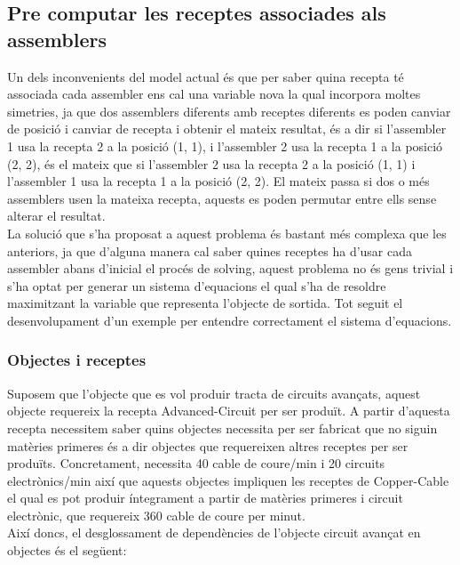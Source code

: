 \subsection{Pre computar les receptes associades als assemblers}\label{precompute-recipes}
Un dels inconvenients del model actual és que per saber quina recepta té associada cada assembler ens cal una variable nova la qual incorpora moltes simetries, ja que dos assemblers diferents amb receptes diferents es poden canviar de posició i canviar de recepta i obtenir el mateix resultat, és a dir si l'assembler 1 usa la recepta 2 a la posició (1, 1), i l'assembler 2 usa la recepta 1 a la posició (2, 2), és el mateix que si l'assembler 2 usa la recepta 2 a la posició (1, 1) i l'assembler 1 usa la recepta 1 a la posició (2, 2). El mateix passa si dos o més assemblers usen la mateixa recepta, aquests es poden permutar entre ells sense alterar el resultat.\\

La solució que s'ha proposat a aquest problema és bastant més complexa que les anteriors, ja que d'alguna manera cal saber quines receptes ha d'usar cada assembler abans d'inicial el procés de solving, aquest problema no és gens trivial i s'ha optat per generar un sistema d'equacions el qual s'ha de resoldre maximitzant la variable que representa l'objecte de sortida. Tot seguit el desenvolupament d'un exemple per entendre correctament el sistema d'equacions.\\

\subsubsection{Objectes i receptes}
Suposem que l'objecte que es vol produir tracta de circuits avançats, aquest objecte requereix la recepta Advanced-Circuit per ser produït. A partir d'aquesta recepta necessitem saber quins objectes necessita per ser fabricat que no siguin matèries primeres és a dir objectes que requereixen altres receptes per ser produïts. Concretament, necessita 40 cable de coure/min i 20 circuits electrònics/min així que aquests objectes impliquen les receptes de Copper-Cable el qual es pot produir íntegrament a partir de matèries primeres i circuit electrònic, que requereix 360 cable de coure per minut.\\

Així doncs, el desglossament de dependències de l'objecte circuit avançat en objectes és el següent:\\

